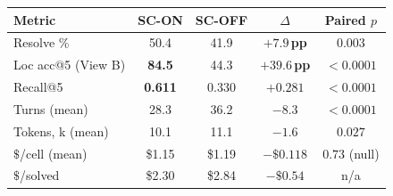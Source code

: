 \begin{tabular}{lcccc}
\toprule
Metric                              & SC-ON          & SC-OFF & $\Delta$                       & Paired $p$ \\
\midrule
Resolve \%                          & 50.4           & 41.9   & $\mathbf{+7.9}$\,\textbf{pp}   & $\mathbf{0.003}$    \\
Loc acc@5 (View B)                  & \textbf{84.5}  & 44.3   & $\mathbf{+39.6}$\,\textbf{pp}  & $\mathbf{<0.0001}$  \\
Recall@5                            & \textbf{0.611} & 0.330  & $\mathbf{+0.281}$              & $\mathbf{<0.0001}$  \\
Turns (mean)                        & 28.3           & 36.2   & $-8.3$                         & $\mathbf{<0.0001}$  \\
Tokens, k (mean)                    & 10.1           & 11.1   & $-1.6$                         & $0.027$             \\
$\$$/cell (mean)                    & \$1.15         & \$1.19 & $-\$0.118$                     & $0.73$ (null)       \\
$\$$/solved                         & \$2.30         & \$2.84 & $-\$0.54$                      & n/a                 \\
\bottomrule
\end{tabular}
